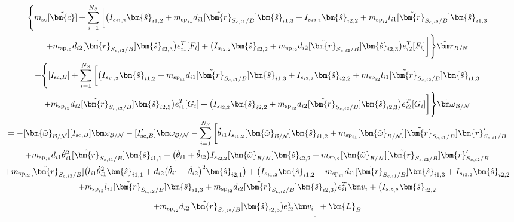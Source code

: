 \begin{multline}
	\Bigg \lbrace m_{\text{sc}} [\tilde{\bm{c}}] + \sum\limits_{i=1}^{N_S} \bigg[  \big(I_{s_{i1,2}}\bm{\hat{s}}_{i1,2}+m_{\text{sp}_{i1}}d_{i1} [\tilde{\bm{r}}_{S_{c,i1}/B}]   \bm{\hat{s}}_{i1,3} + I_{s_{i2,2}}\bm{\hat{s}}_{i2,2}
	+m_{\text{sp}_{i2}}l_{i1} [\tilde{\bm{r}}_{S_{c,i2}/B}]  \bm{\hat{s}}_{i1,3}\\
	+m_{\text{sp}_{i2}}d_{i2} [\tilde{\bm{r}}_{S_{c,i2}/B}] \bm{\hat{s}}_{i2,3}\big)e_{i1}^T[F_i]
	+\big( I_{s_{i2,2}}\bm{\hat{s}}_{i2,2}+m_{\text{sp}_{i2}} d_{i2} [\tilde{\bm{r}}_{S_{c,i2}/B}] \bm{\hat{s}}_{i2,3}\big)e_{i2}^T[F_i] \bigg]\Bigg \rbrace \ddot{\bm r}_{B/N}
	\\+ \Bigg \lbrace [I_{\text{sc},B}] + \sum\limits_{i=1}^{N_S} \bigg[  \big(I_{s_{i1,2}}\bm{\hat{s}}_{i1,2}+m_{\text{sp}_{i1}}d_{i1} [\tilde{\bm{r}}_{S_{c,i1}/B}]   \bm{\hat{s}}_{i1,3} + I_{s_{i2,2}}\bm{\hat{s}}_{i2,2}
	+m_{\text{sp}_{i2}}l_{i1} [\tilde{\bm{r}}_{S_{c,i2}/B}]  \bm{\hat{s}}_{i1,3}\\
	+m_{\text{sp}_{i2}}d_{i2} [\tilde{\bm{r}}_{S_{c,i2}/B}] \bm{\hat{s}}_{i2,3}\big)e_{i1}^T[G_i] +\big( I_{s_{i2,2}}\bm{\hat{s}}_{i2,2}
	+m_{\text{sp}_{i2}} d_{i2} [\tilde{\bm{r}}_{S_{c,i2}/B}] \bm{\hat{s}}_{i2,3}\big)e_{i2}^T[G_i] \bigg]\Bigg \rbrace \dot{\bm\omega}_{\cal B/N}
	\\
	= -[\bm{\tilde{\omega}}_{\cal B/N}] [I_{\text{sc},B}] \bm\omega_{\cal B/N} - [I'_{\text{sc},B}] \bm\omega_{\cal B/N}
	-  \sum\limits_{i=1}^{N_S} \bigg[
	\dot{\theta}_{i1} I_{s_{i1,2}} [\bm{\tilde{\omega}}_{\cal B/N}] \bm{\hat{s}}_{i1,2}
	+m_{\text{sp}_{i1}} [\bm{\tilde{\omega}}_{\cal B/N}] [\tilde{\bm{r}}_{S_{c,i1}/B}] \bm{r}'_{S_{c,i1}/B} \\
	+m_{\text{sp}_{i1}}d_{i1}\dot{\theta}_{i1}^2  [\tilde{\bm{r}}_{S_{c,i1}/B}] \bm{\hat{s}}_{i1,1}
	+ \big(\dot{\theta}_{i1}+\dot{\theta}_{i2}\big) I_{s_{i2,2}}[\bm{\tilde{\omega}}_{\cal B/N}]\bm{\hat{s}}_{i2,2}
	+m_{\text{sp}_{i2}} [\bm{\tilde{\omega}}_{\cal B/N}] [\tilde{\bm{r}}_{S_{c,i2}/B}] \bm{r}'_{S_{c,i2}/B} 	\\+m_{\text{sp}_{i2}} [\tilde{\bm{r}}_{S_{c,i2}/B}] \big(l_{i1} \dot{\theta}_{i1}^2 \bm{\hat{s}}_{i1,1} + d_{i2}\big(\dot{\theta}_{i1} + \dot{\theta}_{i2}\big)^2\bm{\hat{s}}_{i2,1}\big) +   \big(I_{s_{i1,2}}\bm{\hat{s}}_{i1,2}+m_{\text{sp}_{i1}}d_{i1} [\tilde{\bm{r}}_{S_{c,i1}/B}]   \bm{\hat{s}}_{i1,3} + I_{s_{i2,2}}\bm{\hat{s}}_{i2,2}\\
	+m_{\text{sp}_{i2}}l_{i1} [\tilde{\bm{r}}_{S_{c,i2}/B}]  \bm{\hat{s}}_{i1,3}+m_{\text{sp}_{i2}}d_{i2} [\tilde{\bm{r}}_{S_{c,i2}/B}] \bm{\hat{s}}_{i2,3}\big)e_{i1}^T\bm v_i+\big( I_{s_{i2,2}}\bm{\hat{s}}_{i2,2}\\
	+m_{\text{sp}_{i2}} d_{i2} [\tilde{\bm{r}}_{S_{c,i2}/B}] \bm{\hat{s}}_{i2,3}\big)e_{i2}^T\bm v_i\bigg]
	+ \bm{L}_B
	\label{eq:Final8}
\end{multline}

